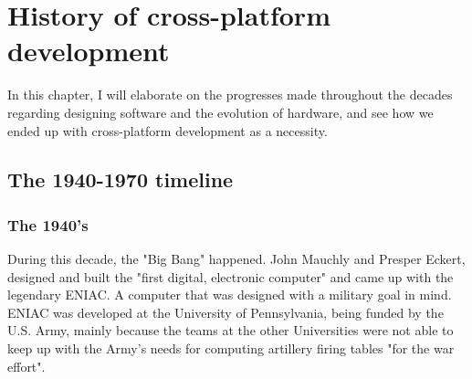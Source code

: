 \chapter{History of cross-platform development}
\label{chap:ch1}

\indent
\par



In this chapter, I will elaborate on the progresses made throughout the decades regarding designing software and the evolution of hardware, and see how we ended up with cross-platform development as a necessity.

\section{The 1940-1970 timeline}

\subsection{The 1940's}

\par

During this decade, the "Big Bang" happened.
John Mauchly and Presper Eckert, designed and built the "first digital, electronic computer"\cite{eniacHistory} and came up with the legendary ENIAC.
A computer that was designed with a military goal in mind.
ENIAC was developed at the University of Pennsylvania, being funded by the U.S.
Army, mainly because the teams at the other Universities were not able to keep up with the Army's needs for computing artillery firing tables "for the war 
effort".\cite{eniacDesign}

